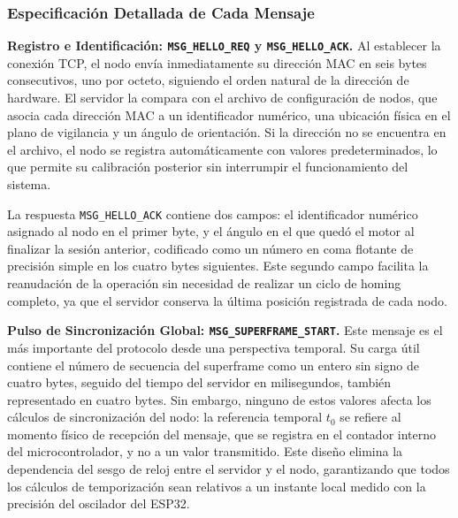 \subsubsection*{Especificación Detallada de Cada Mensaje}

\textbf{Registro e Identificación: \texttt{MSG\_HELLO\_REQ} y \texttt{MSG\_HELLO\_ACK}.} Al establecer la conexión TCP, el nodo envía inmediatamente su dirección MAC en seis bytes consecutivos, uno por octeto, siguiendo el orden natural de la dirección de hardware. El servidor la compara con el archivo de configuración de nodos, que asocia cada dirección MAC a un identificador numérico, una ubicación física en el plano de vigilancia y un ángulo de orientación. Si la dirección no se encuentra en el archivo, el nodo se registra automáticamente con valores predeterminados, lo que permite su calibración posterior sin interrumpir el funcionamiento del sistema.

La respuesta \texttt{MSG\_HELLO\_ACK} contiene dos campos: el identificador numérico asignado al nodo en el primer byte, y el ángulo en el que quedó el motor al finalizar la sesión anterior, codificado como un número en coma flotante de precisión simple en los cuatro bytes siguientes. Este segundo campo facilita la reanudación de la operación sin necesidad de realizar un ciclo de homing completo, ya que el servidor conserva la última posición registrada de cada nodo.

\begin{table}[H]
\centering
{}
\vspace{6pt}
\caption{Mapa de bytes de \texttt{MSG\_HELLO\_ACK}.}
\label{tab:hello_ack}
\end{table}

\textbf{Pulso de Sincronización Global: \texttt{MSG\_SUPERFRAME\_START}.} Este mensaje es el más importante del protocolo desde una perspectiva temporal. Su carga útil contiene el número de secuencia del superframe como un entero sin signo de cuatro bytes, seguido del tiempo del servidor en milisegundos, también representado en cuatro bytes. Sin embargo, ninguno de estos valores afecta los cálculos de sincronización del nodo: la referencia temporal $t_0$ se refiere al momento físico de recepción del mensaje, que se registra en el contador interno del microcontrolador, y no a un valor transmitido. Este diseño elimina la dependencia del sesgo de reloj entre el servidor y el nodo, garantizando que todos los cálculos de temporización sean relativos a un instante local medido con la precisión del oscilador del ESP32.

